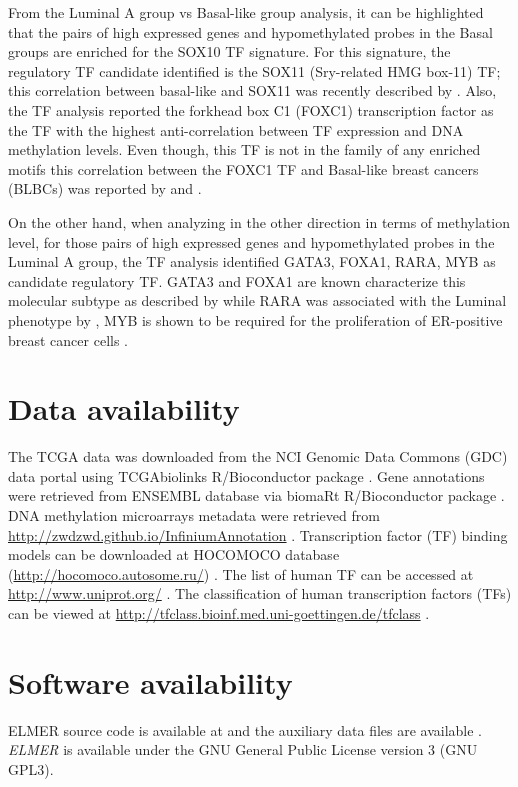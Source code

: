 From the  Luminal A group vs Basal-like group analysis, it can be highlighted that the pairs of high expressed genes and hypomethylated probes in the Basal groups are enriched for the SOX10 TF signature. For this signature, the regulatory TF candidate identified is the SOX11 (Sry-related HMG box-11) TF; this correlation between basal-like and SOX11 was recently described by . Also, the TF analysis  reported the forkhead box C1 (FOXC1) transcription factor as the TF with the highest anti-correlation between TF expression and DNA methylation levels. Even though, this TF is not in the family of any enriched motifs this correlation between the FOXC1 TF and Basal-like breast cancers (BLBCs) was reported by  and .

On the other hand, when analyzing in the other direction in terms of methylation level, for  those pairs of high expressed genes and hypomethylated probes in the Luminal A group, the TF analysis identified GATA3, FOXA1, RARA, MYB as candidate regulatory TF. GATA3 and FOXA1 are known characterize this  molecular subtype  as described by  while RARA was associated with the Luminal phenotype by , MYB
is shown to be required for the proliferation of ER-positive breast cancer cells \cite{mitra2016cdk9}.

\section*{Data availability} %
The TCGA data was downloaded from the NCI Genomic Data Commons (GDC) data portal \cite{grossman2016toward} using TCGAbiolinks R/Bioconductor package \cite{colaprico2015tcgabiolinks,10.12688/f1000research.8923.2}.
Gene annotations were retrieved from ENSEMBL \cite{yates2015ensembl} database via biomaRt R/Bioconductor package \cite{durinck2005biomart,durinck2009mapping}.
DNA methylation microarrays metadata were retrieved from \url{http://zwdzwd.github.io/InfiniumAnnotation} \cite{doi:10.1093/nar/gkw967}.
Transcription factor (TF) binding models can be downloaded at HOCOMOCO database (\url{http://hocomoco.autosome.ru/}) \cite{kulakovskiy2016hocomoco}.
The list of human TF can be accessed at \url{http://www.uniprot.org/}  \cite{apweiler2004uniprot}.
The classification of human transcription factors (TFs) can be viewed at \url{http://tfclass.bioinf.med.uni-goettingen.de/tfclass}  \cite{wingender2013tfclass}.

\section*{Software availability}

ELMER	source code  is available at 
and the auxiliary data files are available .
\textit{ELMER} is available under the GNU General Public License version 3 (GNU GPL3).
